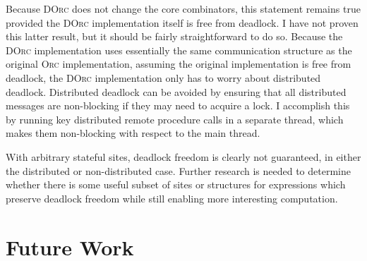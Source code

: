 \documentclass[10pt,letterpaper]{article}
\begin{document}
Because \textsc{DOrc} does not change the core combinators, this statement
remains true provided the \textsc{DOrc} implementation itself is free from
deadlock. I have not proven this latter result, but it should be fairly
straightforward to do so. Because the \textsc{DOrc} implementation uses
essentially the same communication structure as the original \textsc{Orc}
implementation, assuming the original implementation is free from deadlock,
the \textsc{DOrc} implementation only has to worry about distributed deadlock.
Distributed deadlock can be avoided by ensuring that all distributed messages
are non-blocking if they may need to acquire a lock. I accomplish this by
running key distributed remote procedure calls in a separate thread, which
makes them non-blocking with respect to the main thread.

With arbitrary stateful sites, deadlock freedom is clearly not guaranteed, in
either the distributed or non-distributed case. Further research is needed to
determine whether there is some useful subset of sites or structures for
expressions which preserve deadlock freedom while still enabling more
interesting computation.

\section{Future Work}
\label{sec:conclusion}
\end{document}
